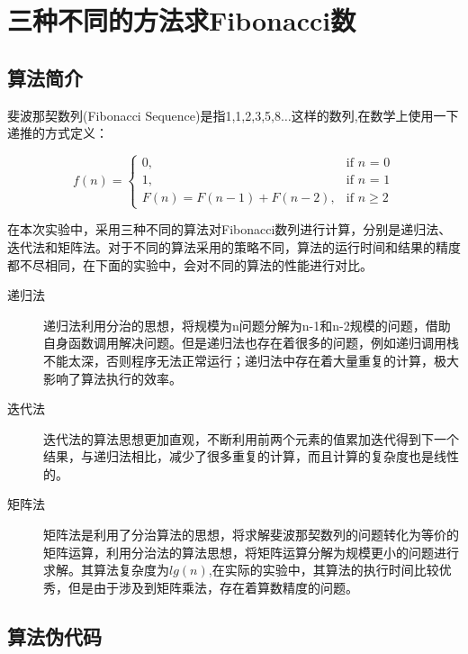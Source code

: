 \documentclass[UTF8]{ctexart}
\begin{document}
\section{三种不同的方法求Fibonacci数}

\subsection{算法简介}
斐波那契数列(Fibonacci Sequence)是指1,1,2,3,5,8$\dots$这样的数列,在数学上使用一下递推的方式定义：

\begin{equation*}
    f(n) =
    \begin{cases}
    0, & \mbox{if }n\mbox{ = 0} \\
    1, & \mbox{if }n\mbox{ = 1} \\
    F(n)=F(n-1)+F(n-2), & \mbox{if }n \geq 2
    \end{cases}    
\end{equation*}

在本次实验中，采用三种不同的算法对Fibonacci数列进行计算，分别是递归法、迭代法和矩阵法。对于不同的算法采用的策略不同，算法的运行时间和结果的精度都不尽相同，在下面的实验中，会对不同的算法的性能进行对比。

\begin{description}
\item[递归法] 递归法利用分治的思想，将规模为n问题分解为n-1和n-2规模的问题，借助自身函数调用解决问题。但是递归法也存在着很多的问题，例如递归调用栈不能太深，否则程序无法正常运行；递归法中存在着大量重复的计算，极大影响了算法执行的效率。
\item[迭代法]
迭代法的算法思想更加直观，不断利用前两个元素的值累加迭代得到下一个结果，与递归法相比，减少了很多重复的计算，而且计算的复杂度也是线性的。
\item[矩阵法]
矩阵法是利用了分治算法的思想，将求解斐波那契数列的问题转化为等价的矩阵运算，利用分治法的算法思想，将矩阵运算分解为规模更小的问题进行求解。其算法复杂度为$lg(n)$,在实际的实验中，其算法的执行时间比较优秀，但是由于涉及到矩阵乘法，存在着算数精度的问题。
\end{description} 

\subsection{算法伪代码}
\end{document}
